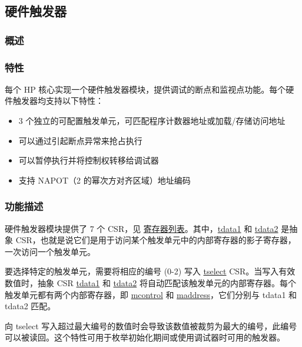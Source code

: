 \documentclass[main\_\_CN.tex]{subfiles}
\begin{document}

\newpage
\subsection{硬件触发器}
\label{sec:riscvcpu-hwt}

\subsubsection{概述}
\label{sec:riscvcpu-hwt-overview}

\subsubsection{特性}
\label{sec:riscvcpu-hwt-features}

每个 HP 核心实现一个硬件触发器模块，提供调试的断点和监视点功能。每个硬件触发器均支持以下特性：

\begin{itemize}
    \item 3 个独立的可配置触发单元，可匹配程序计数器地址或加载/存储访问地址
    \item 可以通过引起断点异常来抢占执行
    \item 可以暂停执行并将控制权转移给调试器
    \item 支持 NAPOT（2 的幂次方对齐区域）地址编码
\end{itemize}

\subsubsection{功能描述}
\label{sec:riscvcpu-hwt-func-descr}

硬件触发器模块提供了 7 个 CSR，见 \hyperref[sec:riscvcpu-hwt-reg-summ]{寄存器列表}。其中，\hyperref[regdesc:TDATA1]{tdata1} 和 \hyperref[regdesc:TDATA2]{tdata2} 是抽象 CSR，也就是说它们是用于访问某个触发单元中的内部寄存器的影子寄存器，一次访问一个触发单元。

要选择特定的触发单元，需要将相应的编号 (0-2) 写入 \hyperref[regdesc:TSELECT]{tselect} CSR。当写入有效数值时，抽象 CSR \hyperref[regdesc:TDATA1]{tdata1} 和 \hyperref[regdesc:TDATA2]{tdata2} 将自动匹配该触发单元的内部寄存器。每个触发单元都有两个内部寄存器，即 \hyperref[regdesc:MCONTROL]{mcontrol} 和 \hyperref[regdesc:MADDRESS]{maddress}，它们分别与 tdata1 和 tdata2 匹配。

向 tselect 写入超过最大编号的数值时会导致该数值被裁剪为最大的编号，此编号可以被读回。这个特性可用于枚举初始化期间或使用调试器时可用的触发器。
\end{document}
